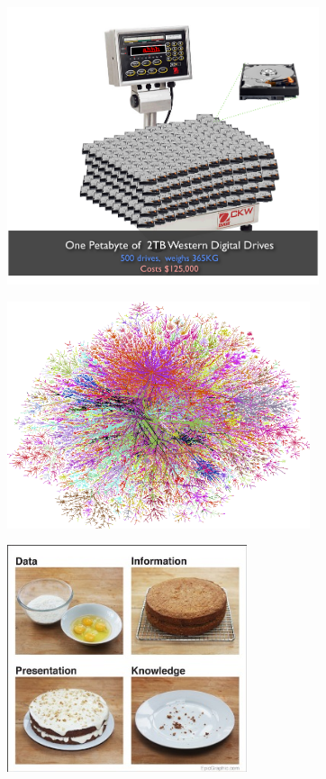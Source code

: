 \documentclass{beamer}
\begin{document}
\begin{frame}[fragile]
\begin{center}
  \includegraphics[height=22em]{1pbwd.png}
\end{center}
\end{frame}

\begin{frame}[fragile]
\begin{center}
  \includegraphics[height=18em]{bigdata.png}
\end{center}
\end{frame}

\begin{frame}[fragile]
\begin{center}
  \includegraphics[height=18em]{OCDQ_cake1.jpg}
\end{center}
\end{frame}
\end{document}

